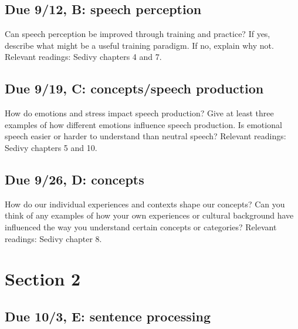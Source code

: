 \documentclass[
  letterpaper,
  DIV=11,
  numbers=noendperiod]{scrreprt}
\begin{document}
\hypertarget{due-912-b-speech-perception}{%
\subsection*{Due 9/12, B: speech
perception}\label{due-912-b-speech-perception}}

Can speech perception be improved through training and practice? If yes,
describe what might be a useful training paradigm. If no, explain why
not. Relevant readings: Sedivy chapters 4 and 7.

\hypertarget{due-919-c-conceptsspeech-production}{%
\subsection*{Due 9/19, C: concepts/speech
production}\label{due-919-c-conceptsspeech-production}}

How do emotions and stress impact speech production? Give at least three
examples of how different emotions influence speech production. Is
emotional speech easier or harder to understand than neutral speech?
Relevant readings: Sedivy chapters 5 and 10.

\hypertarget{due-926-d-concepts}{%
\subsection*{Due 9/26, D: concepts}\label{due-926-d-concepts}}

How do our individual experiences and contexts shape our concepts? Can
you think of any examples of how your own experiences or cultural
background have influenced the way you understand certain concepts or
categories? Relevant readings: Sedivy chapter 8.

\hypertarget{section-2}{%
\section*{Section 2}\label{section-2}}


\hypertarget{due-103-e-sentence-processing}{%
\subsection*{Due 10/3, E: sentence
processing}\label{due-103-e-sentence-processing}}
\end{document}
